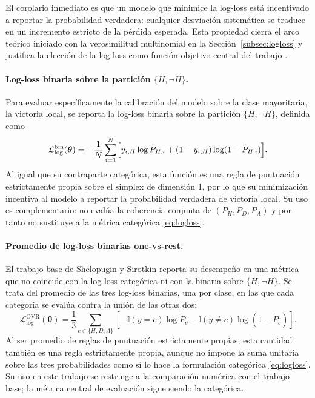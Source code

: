 El corolario inmediato es que un modelo que minimice la log-loss est\'a incentivado a reportar la probabilidad verdadera: cualquier desviaci\'on sistem\'atica se traduce en un incremento estricto de la p\'erdida esperada. Esta propiedad cierra el arco te\'orico iniciado con la verosimilitud multinomial en la Secci\'on~\ref{subsec:logloss} y justifica la elecci\'on de la log-loss como funci\'on objetivo central del trabajo \cite{gneiting2007}.

\paragraph*{Log-loss binaria sobre la partici\'on $\{H, \neg H\}$.}
Para evaluar espec\'ificamente la calibraci\'on del modelo sobre la clase mayoritaria, la victoria local, se reporta la log-loss binaria sobre la partici\'on $\{H, \neg H\}$, definida como
\begin{equation}\label{eq:logloss_binaria}
	\mathcal{L}_{\mathrm{log}}^{\mathrm{bin}}(\boldsymbol{\theta}) 
	= -\frac{1}{N}\sum_{i=1}^{N}\Bigl[ y_{i,H}\log \tilde{P}_{H,i} 
	+ (1-y_{i,H})\log(1-\tilde{P}_{H,i})\Bigr].
\end{equation}
Al igual que su contraparte categ\'orica, esta funci\'on es una regla de puntuaci\'on estrictamente propia sobre el simplex de dimensi\'on 1, por lo que su minimizaci\'on incentiva al modelo a reportar la probabilidad verdadera de victoria local. Su uso es complementario: no eval\'ua la coherencia conjunta de $(P_H, P_D, P_A)$ y por tanto no sustituye a la m\'etrica categ\'orica \eqref{eq:logloss}.

\paragraph*{Promedio de log-loss binarias one-vs-rest.}
El trabajo base de Shelopugin y Sirotkin \cite{Glicko2Mod} reporta su desempe\~no en una m\'etrica que no coincide con la log-loss categ\'orica ni con la binaria sobre $\{H, \neg H\}$. Se trata del promedio de las tres log-loss binarias, una por clase, en las que cada categor\'ia se eval\'ua contra la uni\'on de las otras dos:
\begin{equation}\label{eq:logloss_ovr}
	\mathcal{L}_{\mathrm{log}}^{\mathrm{OVR}}(\boldsymbol{\theta}) = \frac{1}{3}\sum_{c\in\{H,D,A\}} \left[ -\mathbb{I}(y=c)\log \tilde{P}_c - \mathbb{I}(y\neq c)\log(1-\tilde{P}_c) \right].
\end{equation}
Al ser promedio de reglas de puntuaci\'on estrictamente propias, esta cantidad tambi\'en es una regla estrictamente propia, aunque no impone la suma unitaria sobre las tres probabilidades como s\'i lo hace la formulaci\'on categ\'orica \eqref{eq:logloss}. Su uso en este trabajo se restringe a la comparaci\'on num\'erica con el trabajo base; la m\'etrica central de evaluaci\'on sigue siendo la categ\'orica.

